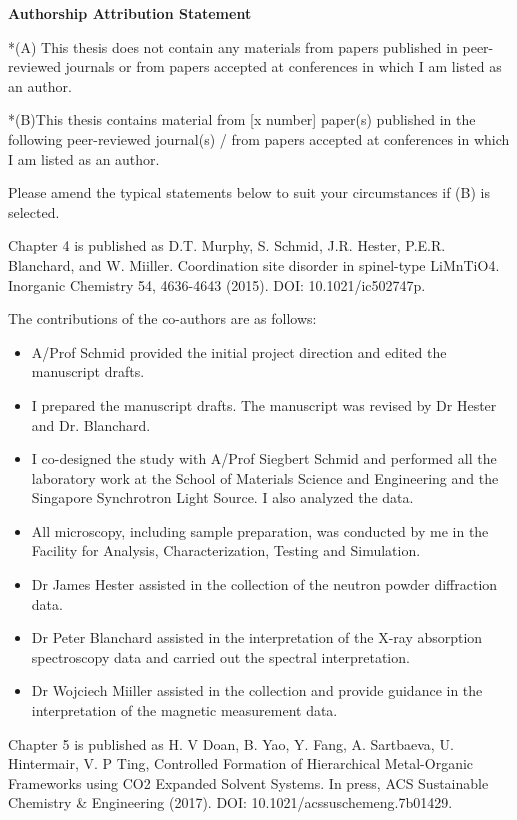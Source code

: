 \newpage
\begin{center}
	{\large \bfseries Authorship Attribution Statement}
\end{center}


*(A) This thesis does not contain any materials from papers published in peer-reviewed journals or from papers accepted at conferences in which I am listed as an author.

*(B)This thesis contains material from [x number] paper(s) published in the following peer-reviewed journal(s) / from papers accepted at conferences in which I am listed as an author.

Please amend the typical statements below to suit your circumstances if (B) is selected.

Chapter 4 is published as D.T. Murphy, S. Schmid, J.R. Hester, P.E.R. Blanchard, and W. Miiller.  Coordination site disorder in spinel-type LiMnTiO4.  Inorganic Chemistry 54, 4636-4643 (2015). DOI: 10.1021/ic502747p.

The contributions of the co-authors are as follows:
\begin{itemize}
	\item A/Prof Schmid provided the initial project direction and edited the manuscript drafts.
	\item I prepared the manuscript drafts.  The manuscript was revised by Dr Hester and Dr. Blanchard.
	\item I co-designed the study with A/Prof Siegbert Schmid and performed all the laboratory work at the School of Materials Science and Engineering and the Singapore Synchrotron Light Source.   I also analyzed the data.
	\item All microscopy, including sample preparation, was conducted by me in the Facility for Analysis, Characterization, Testing and Simulation.
	\item Dr James Hester assisted in the collection of the neutron powder diffraction data.
	\item Dr Peter Blanchard assisted in the interpretation of the X-ray absorption spectroscopy data and carried out the spectral interpretation.
	\item Dr Wojciech Miiller assisted in the collection and provide guidance in the interpretation of the magnetic measurement data.
\end{itemize}

Chapter 5 is published as H. V Doan, B. Yao, Y. Fang, A. Sartbaeva, U. Hintermair, V. P Ting, Controlled Formation of Hierarchical Metal-Organic Frameworks using CO2 Expanded Solvent Systems. In press, ACS Sustainable Chemistry \& Engineering (2017). DOI: 10.1021/acssuschemeng.7b01429.

